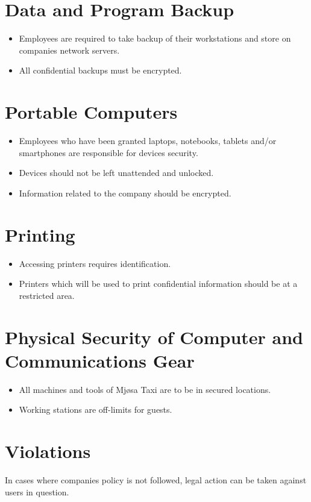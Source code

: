 \section{Data and Program Backup}
    \begin{itemize}[noitemsep]
        \item Employees are required to take backup of their workstations and store on companies network servers.
        \item All confidential backups must be encrypted.
    \end{itemize}
    

\section{Portable Computers}

    \begin{itemize}[noitemsep]
        \item Employees who have been granted laptops, notebooks, tablets and/or smartphones are responsible for devices security.
        \item Devices should not be left unattended and unlocked.
        \item Information related to the company should be encrypted.

    \end{itemize}{}
    

\section{Printing}

    \begin{itemize}[noitemsep]
        \item Accessing printers requires identification.
        \item Printers which will be used to print confidential information should be at a restricted area.
    \end{itemize}{}
    

\section{Physical Security of Computer and Communications Gear}

    \begin{itemize}[noitemsep]
        \item All machines and tools of Mjøsa Taxi are to be in secured locations.
        \item Working stations are off-limits for guests.

    \end{itemize}{}
    

\section{Violations}
In cases where companies policy is not followed, legal action can be taken against users in question.